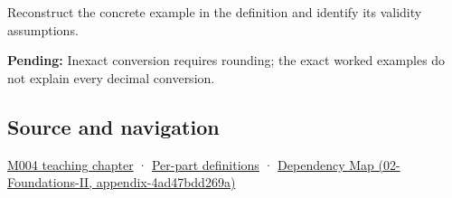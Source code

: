 Reconstruct the concrete example in the definition and identify its validity assumptions.

\textbf{Pending:} Inexact conversion requires rounding; the exact worked examples do not explain every decimal conversion.

\subsection{Source and navigation}\label{appendix-6854d0e2218e-source-and-navigation}

\hyperref[01-foundations-i-ch001-a-stretching-ruler-for-real-valued-quantities]{M004 teaching chapter} · \hyperref[appendix-fd090d982a15-m004---parts-61-76]{Per-part definitions} · \href{../02-Foundations-II/main.pdf\#nameddest=appendix-4ad47bdd269a}{Dependency Map (02-Foundations-II, appendix-4ad47bdd269a)}
